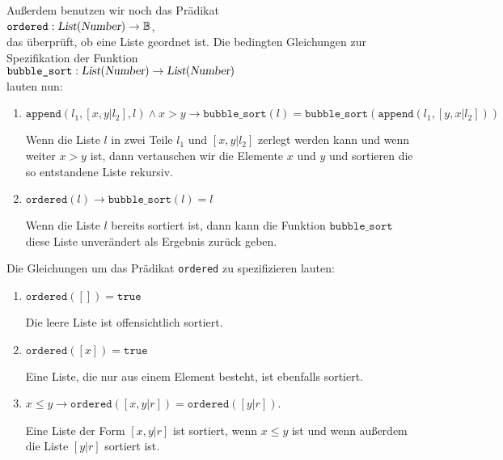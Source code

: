 Außerdem benutzen wir noch das Pr\"{a}dikat \\[0.1cm]
\hspace*{1.3cm} 
$\texttt{ordered}: \textsl{List}(\textsl{Number}) \rightarrow \mathbb{B}$, \\[0.1cm]
das \"{u}berpr\"{u}ft, ob eine Liste geordnet ist.
Die bedingten Gleichungen
zur Spezifikation der Funktion \\[0.1cm]
\hspace*{1.3cm} 
$\texttt{bubble\_sort}: \textsl{List}(\textsl{Number}) \rightarrow \textsl{List}(\textsl{Number})$
\\[0.1cm]
lauten nun:
\begin{enumerate}
\item $\mathtt{append}(l_1, [x,y|l_2], l) \wedge x > y \rightarrow \mathtt{bubble\_sort}(l) = \mathtt{bubble\_sort}(\mathtt{append}(l_1, [y,x|l_2]))$

      Wenn die Liste $l$ in zwei Teile $l_1$ und $[x,y|l_2]$ zerlegt werden kann
      und wenn weiter $x>y$ ist, dann vertauschen wir die Elemente $x$ und $y$
      und sortieren die so entstandene Liste rekursiv.
\item $\mathtt{ordered}(l) \rightarrow \mathtt{bubble\_sort}(l) = l$

      Wenn die Liste $l$ bereits sortiert ist, dann kann die Funktion
      $\mathtt{bubble\_sort}$ diese Liste unver\"{a}ndert als Ergebnis zur\"{u}ck geben.
\end{enumerate}
Die Gleichungen um das Pr\"{a}dikat \texttt{ordered} zu spezifizieren lauten:
\begin{enumerate}
\item $\mathtt{ordered}([]) = \mathtt{true}$

      Die leere Liste ist offensichtlich sortiert.
\item $\mathtt{ordered}([x]) = \mathtt{true}$

      Eine Liste, die nur aus einem Element besteht, ist ebenfalls sortiert.
\item $x \leq y \rightarrow \mathtt{ordered}([x,y|r]) = \mathtt{ordered}([y|r])$.

      Eine Liste der Form $[x,y|r]$ ist sortiert, wenn $x \leq y$ ist und
      wenn außerdem die Liste $[y|r]$ sortiert ist.
\end{enumerate}

